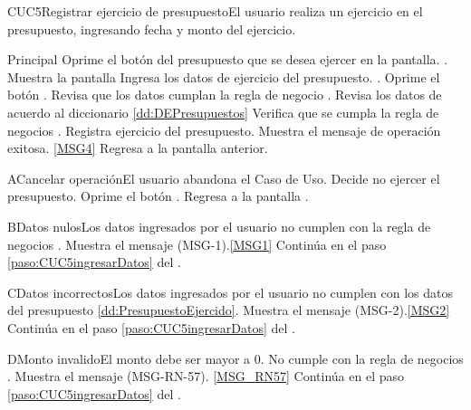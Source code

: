 
	\begin{UseCase}{CUC5}{Registrar ejercicio de presupuesto}{El usuario realiza un ejercicio en el presupuesto, ingresando fecha y monto del ejercicio.}
	\end{UseCase}

	\begin{UCtrayectoria}{Principal}
			\UCpaso[\UCactor] Oprime el botón  del presupuesto que se desea ejercer en la pantalla. .
			\UCpaso Muestra la pantalla  
			\UCpaso [\UCactor] Ingresa los datos de ejercicio del presupuesto.  \label{paso:CUC5ingresarDatos}.
			\UCpaso [\UCactor] Oprime el botón .
			\UCpaso Revisa que los datos cumplan la regla de negocio . 
			\UCpaso Revisa los datos de acuerdo al diccionario \ref{dd:DEPresupuestos} 
			\UCpaso Verifica que se cumpla la regla de negocios .
			\UCpaso Registra ejercicio del presupuesto.
			\UCpaso Muestra el mensaje de operación exitosa. \ref{MSG4}
			\UCpaso Regresa a la pantalla anterior.
	\end{UCtrayectoria}
	\newpage
	\begin{UCtrayectoriaA}{A}{Cancelar operación}{El usuario abandona el Caso de Uso.}
			\UCpaso[\UCactor] Decide no ejercer el presupuesto.
			\UCpaso[\UCactor] Oprime el botón .
			\UCpaso Regresa a la pantalla .
	\end{UCtrayectoriaA}
		
	\begin{UCtrayectoriaA}{B}{Datos nulos}{Los datos ingresados por el usuario  no cumplen con la regla de negocios .}
			\UCpaso Muestra el mensaje (MSG-1).\ref{MSG1}
			\UCpaso Continúa en el paso \ref{paso:CUC5ingresarDatos} del .
	\end{UCtrayectoriaA}
	\begin{UCtrayectoriaA}{C}{Datos incorrectos}{Los datos ingresados por el usuario  no cumplen con los datos del presupuesto \ref{dd:PresupuestoEjercido}.}
			\UCpaso Muestra el mensaje (MSG-2).\ref{MSG2}
			\UCpaso Continúa en el paso \ref{paso:CUC5ingresarDatos} del .
	\end{UCtrayectoriaA}

	\begin{UCtrayectoriaA}{D}{Monto invalido}{El monto debe ser mayor a 0. No cumple con la regla de negocios .}
		\UCpaso Muestra el mensaje (MSG-RN-57). \ref{MSG_RN57}
		\UCpaso Continúa en el paso \ref{paso:CUC5ingresarDatos} del .
	\end{UCtrayectoriaA}

